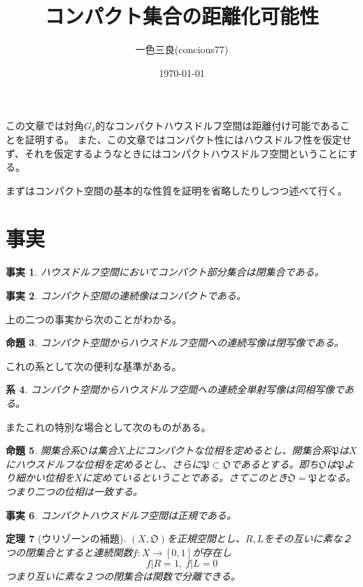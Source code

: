 \documentclass[leqno]{jsarticle}
\title{コンパクト集合の距離化可能性}
\author{一色三良(concious77)}
\date{\today}
\newtheorem{thm}{定理}
\newtheorem{prop}[thm]{命題}
\newtheorem{cor}[thm]{系}
\newtheorem{fact}[thm]{事実}
\begin{document}
\maketitle
この文章では対角$G_{\delta}$的なコンパクトハウスドルフ空間は距離付け可能であることを証明する。
また、この文章ではコンパクト性にはハウスドルフ性を仮定せず、それを仮定するようなときにはコンパクトハウスドルフ空間ということにする。

まずはコンパクト空間の基本的な性質を証明を省略したりしつつ述べて行く。
\section{事実}
\begin{fact}
ハウスドルフ空間においてコンパクト部分集合は閉集合である。
\end{fact}

\begin{fact}
コンパクト空間の連続像はコンパクトである。
\end{fact}

上の二つの事実から次のことがわかる。
\begin{prop}
コンパクト空間からハウスドルフ空間への連続写像は閉写像である。
\end{prop}

これの系として次の便利な基準がある。
\begin{cor}
コンパクト空間からハウスドルフ空間への連続全単射写像は同相写像である。
\end{cor}

またこれの特別な場合として次のものがある。
\begin{prop}\label{fact}
開集合系$\mathfrak{O}$は集合$X$上にコンパクトな位相を定めるとし、開集合系$\mathfrak{P}$は$X$にハウスドルフな位相を定めるとし、さらに$\mathfrak{P}\subset \mathfrak{O}$であるとする。即ち$\mathfrak{O}$は$\mathfrak{P}$より細かい位相を$X$に定めているということである。さてこのとき$\mathfrak{O}=\mathfrak{P}$となる。つまり二つの位相は一致する。
\end{prop}

\begin{fact}
コンパクトハウスドルフ空間は正規である。
\end{fact}

\begin{thm}[ウリゾーンの補題]
$(X,\mathfrak{O})$を正規空間とし、$R,L$をその互いに素な２つの閉集合とすると連続関数$f:X\rightarrow [0,1]$が存在し
\[
f|R=1,\ f|L=0
\]つまり互いに素な２つの閉集合は関数で分離できる。
\end{thm}
\end{document}

